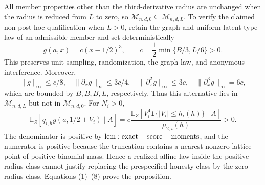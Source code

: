 All member properties other than the third-derivative radius are unchanged when the radius is reduced from \(L\) to zero, so \(\mathcal M_{n,d,0}\subseteq\mathcal M_{n,d,L}\).  To verify the claimed non-post-hoc qualification when \(L>0\), retain the graph and uniform latent-type law of an admissible member and set deterministically
\[
 g(a,x)=c(x-1/2)^3,
 \qquad c=\frac12\min\{B/3,L/6\}>0.
\tag{7}
\]
This preserves unit sampling, randomization, the graph law, and anonymous interference.  Moreover,
\[
 \|g\|_\infty\leq c/8,\quad
 \|\partial_xg\|_\infty\leq3c/4,\quad
 \|\partial_x^2g\|_\infty\leq3c,\quad
 \|\partial_x^3g\|_\infty=6c,
\]
which are bounded by \(B,B,B,L\), respectively.  Thus this alternative lies in \(\mathcal M_{n,d,L}\) but not in \(\mathcal M_{n,d,0}\).  For \(N_i>0\),
\[
 \mathbb E_Z[q_{i,h}g(a,1/2+V_i)\mid A]
 =c\frac{\mathbb E_Z[V_i^4\mathbf1\{|V_i|\leq h_i(h)\}\mid A]}{\mu_{2,i}(h)}>0.
\tag{8}
\]
The denominator is positive by \({\rm lem:exact-score-moments}\), and the numerator is positive because the truncation contains a nearest nonzero lattice point of positive binomial mass.  Hence a realized affine law inside the positive-radius class cannot justify replacing the prespecified honesty class by the zero-radius class.  Equations (1)--(8) prove the proposition.